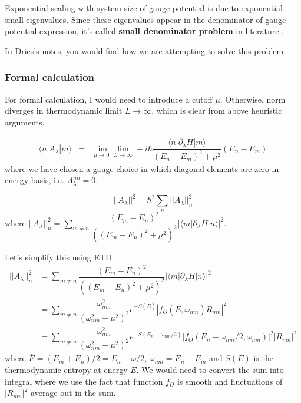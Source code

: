 \documentclass[11pt,a4paper]{article}
\begin{document}
Exponential scaling with system size of gauge potential is due to exponential small eigenvalues. Since these eigenvalues appear in the denominator of gauge potential expression, it's called \textbf{small denominator problem} in literature \cite{kolodrubetz2016geometry}. 

In Dries's notes, you would find how we are attempting to solve this problem.

\subsubsection{Formal calculation}
For formal calculation, I would need to introduce a cutoff $\mu$. Otherwise, norm diverges in thermodynamic limit $L \rightarrow \infty$, which is clear from above heuristic arguments.

\begin{eqnarray}
\langle n | A_{\lambda} | m \rangle &=& \lim_{\mu \rightarrow 0} \lim_{L \rightarrow \infty } -i \hbar \dfrac{\langle n | \partial_{\lambda}H  | m \rangle}{(E_n-E_m)^2 + \mu^2} (E_n-E_m) 
\label{off-digonal}
\end{eqnarray}
where we have chosen a gauge choice in which diagonal elements are zero in energy basis, i.e. $A_{\lambda}^{nn}=0$. 

\begin{equation}
||A_{\lambda}||^2 = \hbar^2\sum_n ||A_{\lambda}||^2_{n}
\end{equation}
where $||A_{\lambda}||^2_{n} =\sum_{m \neq n}  \dfrac{(E_m-E_n)^2}{((E_m-E_n)^2 + \mu^2)^2} |\langle m | \partial_{\lambda}H| n \rangle|^2$.

Let's simplify this using ETH:
\begin{align*}
||A_{\lambda}||^2_{n} &= \sum_{m \neq n}  \dfrac{(E_m-E_n)^2}{((E_m-E_n)^2 + \mu^2)^2} |\langle m | \partial_{\lambda}H| n \rangle|^2\\
&=\sum_{m \neq n}  \dfrac{\omega_{nm}^2}{(\omega_{nm}^2 + \mu^2)^2} e^{-S(\bar{E})} |f_O(\bar{E}, \omega_{nm}) R_{mn}|^2\\
&=\sum_{m \neq n}  \dfrac{\omega_{nm}^2}{(\omega_{nm}^2 + \mu^2)^2} e^{-S(E_n -\omega_{nm}/2)} |f_O(E_n - \omega_{nm}/2, \omega_{nm})|^2 |R_{mn}|^2
\end{align*}
where $\bar{E}= (E_m +E_n)/2=E_n - \omega/2$, $\omega_{nm}= E_n- E_m$ and $S(E)$ is the thermodynamic entropy at energy $E$.
We would need to convert the sum into integral where we use the fact that function $f_O$ is smooth and fluctuations of $|R_{mn}|^2$ average out in the sum.
\end{document}
